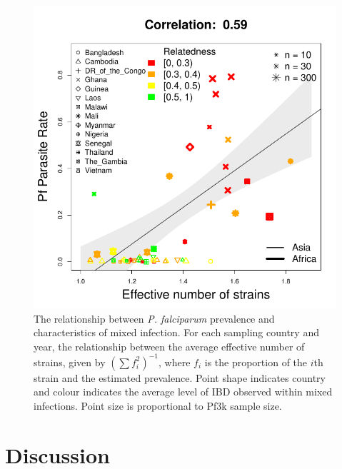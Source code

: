 \documentclass[9pt,lineno]{elife}
\begin{document}
\begin{figure}[h]
  \centering{}
  \includegraphics[width=.6\textwidth]{Fig5.pdf}
  \caption{The relationship between {\it P. falciparum} prevalence and characteristics of mixed infection. For each sampling country and year, the relationship between the average effective number of strains, given by $(\sum f_i^2)^{-1}$, where $f_i$ is the proportion of the $i$th strain and the estimated prevalence.  Point shape indicates country and colour indicates the average level of IBD observed within mixed infections. Point size is proportional to Pf3k sample size.}
  \label{fig:model}
\end{figure}


\section{Discussion}
\end{document}
